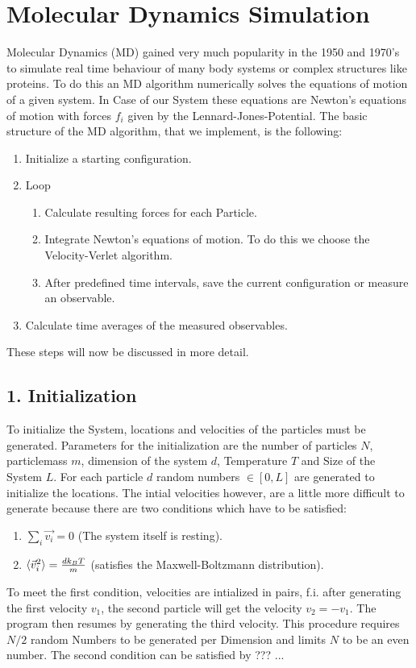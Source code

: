 \section{Molecular Dynamics Simulation}
Molecular Dynamics (MD) gained very much popularity in the 1950 and 1970's to simulate real time behaviour of many body systems or complex structures like proteins. To do this an MD algorithm numerically solves the equations of motion of a given system. In Case of our System these equations are Newton's equations of motion with forces $f_i$ given by the Lennard-Jones-Potential. The basic structure of the MD algorithm, that we implement, is the following:
\begin{enumerate}
\item Initialize a starting configuration.
\item Loop
\begin{enumerate}
\item Calculate resulting forces for each Particle.
\item Integrate Newton's equations of motion. To do this we choose the Velocity-Verlet algorithm.
\item After predefined time intervals, save the current configuration or measure an observable.
\end{enumerate}
\item Calculate time averages of the measured observables.
\end{enumerate}
These steps will now be discussed in more detail.

\subsection*{1. Initialization}
To initialize the System, locations and velocities of the particles must be generated. Parameters for the initialization are the number of particles $N$, particlemass $m$, dimension of the system $d$, Temperature $T$ and Size of the System $L$. For each particle $d$ random numbers $\in [0,L]$ are generated to initialize the locations. 
The intial velocities however, are a little more difficult to generate because there are two conditions which have to be satisfied:
\begin{enumerate}
\item $\sum_i \vec{v_i}=0$ (The system itself is resting).
\item $\braket{\vec{v}_i^2}=\frac{d k_B T}{m}$ (satisfies the Maxwell-Boltzmann distribution).
\end{enumerate}
To meet the first condition, velocities are intialized in pairs, f.i. after generating the first velocity $v_1$, the second particle will get the velocity $v_2 = -v_1$. The program then resumes by generating the third velocity. This procedure requires $N/2$ random Numbers to be generated per Dimension and limits $N$ to be an even number.
The second condition can be satisfied by ??? ... 

